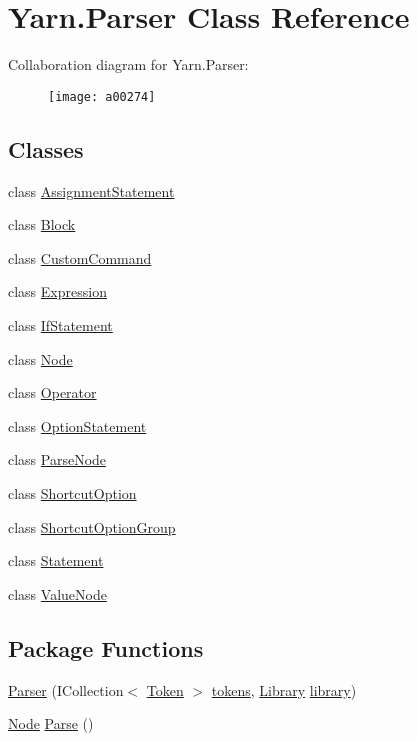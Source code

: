 \hypertarget{a00078}{\section{Yarn.\-Parser Class Reference}
\label{a00078}
}


Collaboration diagram for Yarn.\-Parser\-:
\nopagebreak
\begin{figure}[H]
\begin{center}
\leavevmode
\texttt{[image: a00274]}
\end{center}
\end{figure}
\subsection*{Classes}
\begin{DoxyCompactItemize}
\item 
class \hyperlink{a00033}{Assignment\-Statement}
\item 
class \hyperlink{a00036}{Block}
\item 
class \hyperlink{a00046}{Custom\-Command}
\item 
class \hyperlink{a00054}{Expression}
\item 
class \hyperlink{a00057}{If\-Statement}
\item 
class \hyperlink{a00068}{Node}
\item 
class \hyperlink{a00072}{Operator}
\item 
class \hyperlink{a00075}{Option\-Statement}
\item 
class \hyperlink{a00077}{Parse\-Node}
\item 
class \hyperlink{a00084}{Shortcut\-Option}
\item 
class \hyperlink{a00085}{Shortcut\-Option\-Group}
\item 
class \hyperlink{a00090}{Statement}
\item 
class \hyperlink{a00101}{Value\-Node}
\end{DoxyCompactItemize}
\subsection*{Package Functions}
\begin{DoxyCompactItemize}
\item 
\hyperlink{a00078_acd2714b911fb5e7c38f0e07a9dc1af58}{Parser} (I\-Collection$<$ \hyperlink{a00093}{Token} $>$ \hyperlink{a00078_a1a4de646937057988b59d2ff8035eae3}{tokens}, \hyperlink{a00063}{Library} \hyperlink{a00078_a1313951b09177a1c83b6cf035139197a}{library})
\item 
\hyperlink{a00068}{Node} \hyperlink{a00078_a811cc7226f4f4a2f3440cdb67ad14468}{Parse} ()
\end{DoxyCompactItemize}
